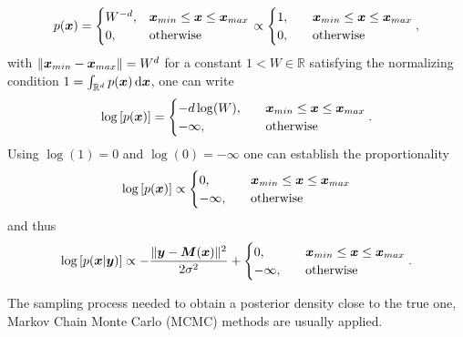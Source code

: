 \documentclass[a4paper,12pt]{report}
\begin{document}
\begin{equation}
p(\bm{x}) = \begin{cases}
W^{-d}, &\bm{x}_{min} \leq \bm{x} \leq \bm{x}_{max} \\
0, \quad &\text{otherwise}
\end{cases} \propto \begin{cases}
1, &\bm{x}_{min} \leq \bm{x} \leq \bm{x}_{max} \\
0, \quad &\text{otherwise}
\end{cases},
\end{equation} with $\|\bm{x}_{min}-\bm{x}_{max}\| = W^d$ for a constant $1 < W \in \mathbb{R}$ satisfying the normalizing condition $1 = \int_{\mathbb{R}^d}p(\bm{x})\,\mathrm{d}\bm{x}$, one can write \begin{equation}
\log\left[p(\bm{x})\right] = \begin{cases} -d\log(W), \quad &\bm{x}_{min} \leq \bm{x} \leq \bm{x}_{max} \\
-\infty, \quad &\text{otherwise}  \end{cases}.
\end{equation} Using $\log(1) = 0$ and $\log(0) = -\infty$ one can establish the proportionality  \begin{equation}
\log\left[p(\bm{x})\right] \propto \begin{cases}
0, &\bm{x}_{min} \leq \bm{x} \leq \bm{x}_{max} \\
-\infty, \quad &\text{otherwise}
\end{cases}
\end{equation} and thus \begin{equation}
\log\left[p(\bm{x}|\bm{y})\right] \propto -\frac{\|\bm{y}-\bm{M}(\bm{x})\|^2}{2\sigma^2} + \begin{cases}
0, &\bm{x}_{min} \leq \bm{x} \leq \bm{x}_{max} \\
-\infty, \quad &\text{otherwise}
\end{cases}.
\end{equation}

The sampling process needed to obtain a posterior density close to the true one, Markov Chain Monte Carlo (MCMC) methods are usually applied.
\end{document}
